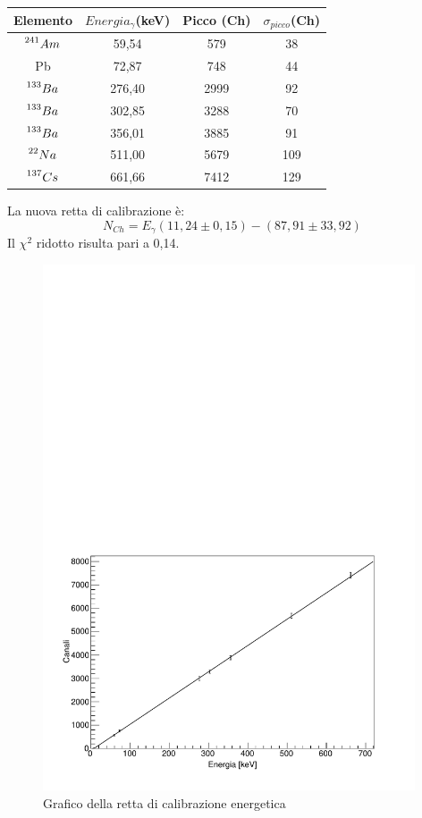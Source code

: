 \documentclass[italian,11pt]{report}
\begin{document}
\begin{center}
    \centering
    \begin{tabular}{cccc}
    \hline
    Elemento& $Energia_{\gamma}$(keV)& Picco (Ch) &  $\sigma_{picco}$(Ch)\\
    \hline\hline
    $\prescript{241}{}{Am}_{}^{}$ & 59,54 & 579 & 38 \\
    Pb & 72,87 & 748 & 44 \\
    $\prescript{133}{}{Ba}_{}^{}$ & 276,40 & 2999 & 92 \\
    $\prescript{133}{}{Ba}_{}^{}$ & 302,85 & 3288 & 70 \\
    $\prescript{133}{}{Ba}_{}^{}$ & 356,01 & 3885 & 91 \\
    $\prescript{22}{}{Na}_{}^{}$ & 511,00 & 5679 & 109 \\
    $\prescript{137}{}{Cs}_{}^{}$ & 661,66 & 7412 & 129 \\
    
    \hline
    \end{tabular}
    \end{center}
 La nuova retta di calibrazione è: 
 $$N_{Ch}=E_{\gamma}(11,24\pm0,15)-(87,91\pm33,92)$$ Il $\chi^2$ ridotto risulta pari a 0,14.
 
 \vspace{3mm}
 
 \begin{figure}[htp]
\centering
\includegraphics[width=11cm]{regressione.pdf}
\caption{Grafico della retta di calibrazione energetica}
\end{figure}
 
\end{document}
